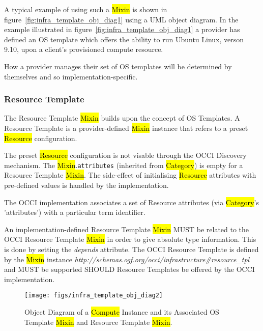 \documentclass[10pt,a4paper]{article}
\begin{document}

A typical example of using such a \hl{Mixin} is shown in
figure~\ref{fig:infra_template_obj_diag1} using a UML object diagram.
In the example illustrated in
figure~\ref{fig:infra_template_obj_diag1} a provider has defined an OS
template which offers the ability to run Ubuntu Linux, verson 9.10,
upon a client's provisioned compute resource.

How a provider manages their set of OS templates will be determined by
themselves and so implementation-specific.

\subsubsection{Resource Template}
The Resource Template \hl{Mixin} builds upon the concept of OS
Templates. A Resource Template is a provider-defined \hl{Mixin}
instance that refers to a preset \hl{Resource} configuration.

The preset \hl{Resource} configuration is not visable through the OCCI
Discovery mechanism. The \hl{Mixin}.{\tt attributes} (inherited from
\hl{Category}) is empty for a Resource Template \hl{Mixin}.  The
side-effect of initialising \hl{Resource} attributes with pre-defined
values is handled by the implementation.

The OCCI implementation associates a set of Resource attributes (via
\hl{Category}'s 'attributes') with a particular term identifier.

An implementation-defined Resource Template \hl{Mixin} MUST be related
to the OCCI Resource Template \hl{Mixin} in order to give absolute
type information. This is done by setting the \textit{depends} attribute.
The OCCI Resource Template is defined by the
\hl{Mixin} instance
\textit{http://schemas.ogf.org/occi/infrastructure\#resource\_tpl} and
MUST be supported SHOULD Resource Templates be offered by the OCCI
implementation.

\begin{figure}[!h]
	\centering
	\texttt{[image: figs/infra\_template\_obj\_diag2]}
	\caption{Object Diagram of a \hl{Compute} Instance and its Associated OS Template
	\hl{Mixin} and Resource Template \hl{Mixin}.}
	\label{fig:infra_template_obj_diag2}
\end{figure}
\end{document}
